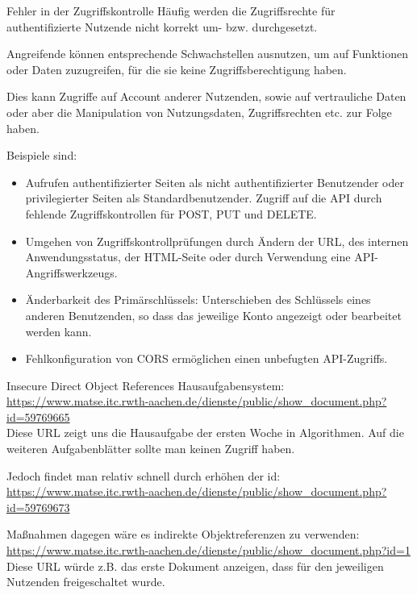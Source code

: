 \begin{defi}{Fehler in der Zugriffskontrolle}
    Häufig werden die Zugriffsrechte für authentifizierte Nutzende nicht korrekt um- bzw. durchgesetzt.

    Angreifende können entsprechende Schwachstellen ausnutzen, um auf Funktionen oder Daten zuzugreifen, für die sie keine Zugriffsberechtigung haben.

    Dies kann Zugriffe auf Account anderer Nutzenden, sowie auf vertrauliche Daten oder aber die Manipulation von Nutzungsdaten, Zugriffsrechten etc. zur Folge haben.

    Beispiele sind:
    \begin{itemize}
        \item Aufrufen authentifizierter Seiten als nicht authentifizierter Benutzender oder privilegierter Seiten als Standardbenutzender.
              Zugriff auf die API durch fehlende Zugriffskontrollen für POST, PUT und DELETE.
        \item Umgehen von Zugriffskontrollprüfungen durch Ändern der URL, des internen Anwendungsstatus, der HTML-Seite oder durch Verwendung eine API-Angriffswerkzeugs.
        \item Änderbarkeit des Primärschlüssels: Unterschieben des Schlüssels eines anderen Benutzenden, so dass das jeweilige Konto angezeigt oder bearbeitet werden kann.
        \item Fehlkonfiguration von CORS ermöglichen einen unbefugten API-Zugriffs.
    \end{itemize}
\end{defi}

\begin{example}{Insecure Direct Object References}
    Hausaufgabensystem: \\
    \url{https://www.matse.itc.rwth-aachen.de/dienste/public/show\_document.php?id=59769665} \\
    Diese URL zeigt uns die Hausaufgabe der ersten Woche in Algorithmen.
    Auf die weiteren Aufgabenblätter sollte man keinen Zugriff haben.

    Jedoch findet man relativ schnell durch erhöhen der id: \\
    \url{https://www.matse.itc.rwth-aachen.de/dienste/public/show\_document.php?id=59769673}

    Maßnahmen dagegen wäre es indirekte Objektreferenzen zu verwenden: \\
    \url{https://www.matse.itc.rwth-aachen.de/dienste/public/show\_document.php?id=1} \\
    Diese URL würde z.B. das erste Dokument anzeigen, dass für den jeweiligen Nutzenden freigeschaltet wurde.
\end{example}

